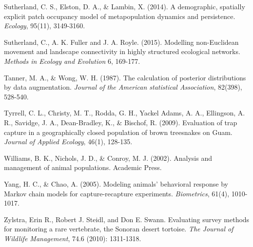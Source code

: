 \documentclass{book}
\begin{document}
\rf Sutherland, C. S., Elston, D. A., \& Lambin, X. (2014). A demographic, spatially explicit patch occupancy model of metapopulation dynamics and persistence. \textit{Ecology}, 95(11), 3149-3160.

\rf Sutherland, C., A. K. Fuller and J. A. Royle. (2015). Modelling non-Euclidean movement and landscape connectivity in highly structured ecological networks. {\it Methods in Ecology and Evolution}  6, 169-177.

\rf Tanner, M. A., \& Wong, W. H. (1987). The calculation of posterior distributions by data augmentation. \textit{Journal of the American statistical Association}, 82(398), 528-540.

\rf Tyrrell, C. L., Christy, M. T., Rodda, G. H., Yackel Adams, A. A., Ellingson, A. R., Savidge, J. A., Dean-Bradley, K., \& Bischof, R. (2009). Evaluation of trap capture in a geographically closed population of brown treesnakes on Guam. \textit{Journal of Applied Ecology}, 46(1), 128-135.

\rf Williams, B. K., Nichols, J. D., \& Conroy, M. J. (2002). Analysis and management of animal populations. Academic Press.

\rf Yang, H. C., \& Chao, A. (2005). Modeling animals' behavioral response by Markov chain models for capture-recapture experiments. \textit{Biometrics}, 61(4), 1010-1017.

\rf Zylstra, Erin R., Robert J. Steidl, and Don E. Swann. Evaluating survey methods for monitoring a rare vertebrate, the Sonoran desert tortoise. \textit{The Journal of Wildlife Management}, 74.6 (2010): 1311-1318.
\end{document}
